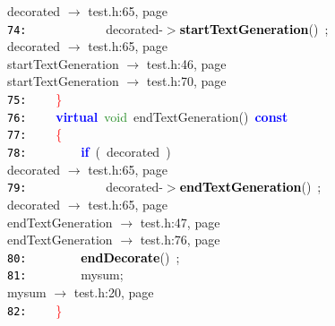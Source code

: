 \documentclass{article}
\begin{document}
\mbox{}{\hfill decorated $\rightarrow$ test.h:65, page~\pageref{test.h:65}} \\
\mbox{}\texttt{\textcolor{Black}{74:}} \ \ \ \ \ \ \ \ \ \ \ \ decorated\textcolor{BrickRed}{-$>$}\textbf{\textcolor{Black}{startTextGeneration}}\textcolor{BrickRed}{()}\ \textcolor{BrickRed}{;} \\
\mbox{}{\hfill decorated $\rightarrow$ test.h:65, page~\pageref{test.h:65}} \\
\mbox{}{\hfill startTextGeneration $\rightarrow$ test.h:46, page~\pageref{test.h:46}} \\
\mbox{}{\hfill startTextGeneration $\rightarrow$ test.h:70, page~\pageref{test.h:70}} \\
\mbox{}\texttt{\textcolor{Black}{75:}} \ \ \ \ \textcolor{Red}{\}} \\
\mbox{}\texttt{\textcolor{Black}{76:}} \ \ \ \ \textbf{\textcolor{Blue}{virtual}}\ \textcolor{ForestGreen}{void}\ \label{test.h:76}endTextGeneration\textcolor{BrickRed}{()}\ \textbf{\textcolor{Blue}{const}}\  \\
\mbox{}\texttt{\textcolor{Black}{77:}} \ \ \ \ \textcolor{Red}{\{}\  \\
\mbox{}\texttt{\textcolor{Black}{78:}} \ \ \ \ \ \ \ \ \textbf{\textcolor{Blue}{if}}\ \textcolor{BrickRed}{(}\ decorated\ \textcolor{BrickRed}{)} \\
\mbox{}{\hfill decorated $\rightarrow$ test.h:65, page~\pageref{test.h:65}} \\
\mbox{}\texttt{\textcolor{Black}{79:}} \ \ \ \ \ \ \ \ \ \ \ \ decorated\textcolor{BrickRed}{-$>$}\textbf{\textcolor{Black}{endTextGeneration}}\textcolor{BrickRed}{()}\ \textcolor{BrickRed}{;} \\
\mbox{}{\hfill decorated $\rightarrow$ test.h:65, page~\pageref{test.h:65}} \\
\mbox{}{\hfill endTextGeneration $\rightarrow$ test.h:47, page~\pageref{test.h:47}} \\
\mbox{}{\hfill endTextGeneration $\rightarrow$ test.h:76, page~\pageref{test.h:76}} \\
\mbox{}\texttt{\textcolor{Black}{80:}} \ \ \ \ \ \ \ \ \textbf{\textcolor{Black}{endDecorate}}\textcolor{BrickRed}{()}\ \textcolor{BrickRed}{;} \\
\mbox{}\texttt{\textcolor{Black}{81:}} \ \ \ \ \ \ \ \ mysum\textcolor{BrickRed}{;} \\
\mbox{}{\hfill mysum $\rightarrow$ test.h:20, page~\pageref{test.h:20}} \\
\mbox{}\texttt{\textcolor{Black}{82:}} \ \ \ \ \textcolor{Red}{\}} \\
\end{document}
